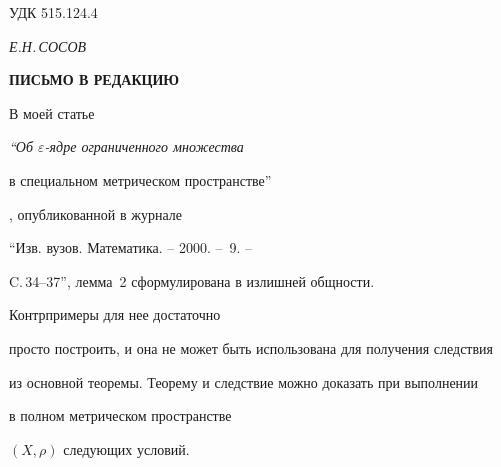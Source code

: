 




\date{}


\setcounter{page}{81}


\pagestyle{plain}





\label{begin}





\hfill {УДК 515.124.4}


\centerline{\it Е.Н.\,СОСОВ}


\bigskip





\begin{center} 


{\bf ПИСЬМО В РЕДАКЦИЮ}


\end{center}


\bigskip





В моей статье {\it ``Об ${\varepsilon}$-ядре ограниченного множества 


в специальном метрическом пространстве''}, опубликованной в журнале


``Изв. вузов. Математика. -- 2000. -- \No\,9. --


C.\,34--37'', лемма~2 сформулирована в излишней общности.


Контрпримеры для нее достаточно 


просто построить, и она не может быть использована для получения следствия


из основной теоремы. Теорему и следствие можно доказать при выполнении


в полном метрическом пространстве 


$(X,\rho )$ следующих условий.


